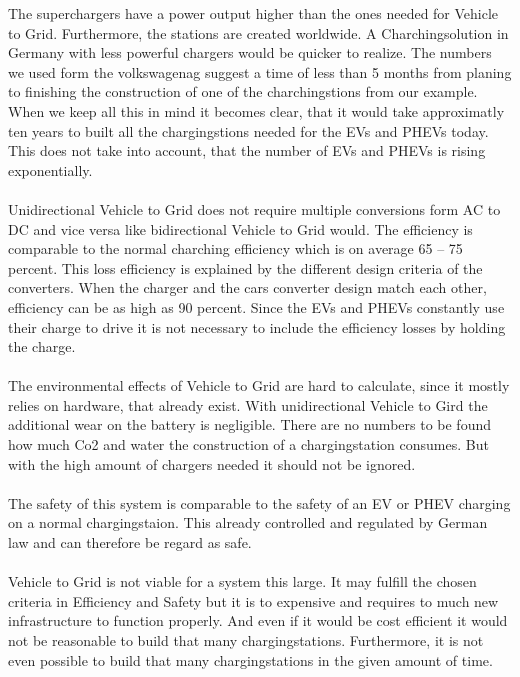 \documentclass[12pt,a4paper]{article}
\begin{document}
\begin{parcolumns}[colwidths={1=2.5 cm, 2=10 cm, 3=2.5cm}]{3}
{%
The superchargers have a power output higher than the ones needed for Vehicle to Grid. Furthermore, the stations are created worldwide. A Charchingsolution in Germany with less powerful chargers would be quicker to realize. The numbers we used form the volkswagenag suggest a time of less than 5 months from planing to finishing the construction of one of the charchingstions from our example. When we keep all this in mind it becomes clear, that it would take approximatly ten years to built all the chargingstions needed for the EVs and PHEVs today. This does not take into account, that the number of EVs and PHEVs is rising exponentially.
\\ \\
\noindent
Unidirectional Vehicle to Grid does not require multiple conversions form AC to DC and vice versa like bidirectional Vehicle to Grid would. The efficiency is comparable to the normal charching efficiency which is on average 65 – 75 percent. This loss efficiency is explained by the different design criteria of the converters. When the charger and the cars converter design match each other, efficiency can be as high as 90 percent. Since the EVs and PHEVs constantly use their charge to drive it is not necessary to include the efficiency losses by holding the charge.%
\\ \\
\noindent
The environmental effects of Vehicle to Grid are hard to calculate, since it mostly relies on hardware, that already exist. With unidirectional Vehicle to Gird the additional wear on the battery is negligible. There are no numbers to be found how much Co2 and water the construction of a chargingstation consumes. But with the high amount of chargers needed it should not be ignored.
\\ \\
\noindent
The safety of this system is comparable to the safety of an EV or PHEV charging on a normal chargingstaion. This already controlled and regulated by German law and can therefore be regard as safe.%
\\ \\
\noindent
Vehicle to Grid is not viable for a system this large. It may fulfill the chosen criteria in Efficiency and Safety but it is to expensive and requires to much new infrastructure to function properly. And even if it would be cost efficient it would not be reasonable to build that many chargingstations. Furthermore, it is not even possible to build that many chargingstations in the given amount of time.
}
\end{parcolumns}
\end{document}
